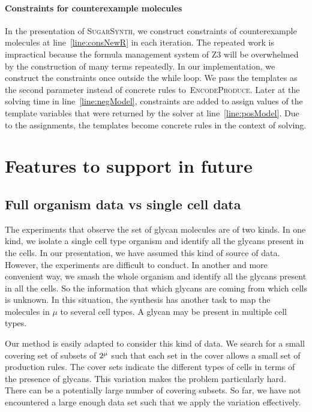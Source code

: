 \documentclass{llncs}
\begin{document}
\paragraph{Constraints for counterexample molecules}
In the presentation of \textsc{SugarSynth}, we construct constraints of counterexample molecules
at line~\ref{line:consNewR} in each iteration.
The repeated work is impractical because the formula management system of Z3 will be overwhelmed by
the construction of many terms repeatedly. In our implementation, we construct the constraints
once outside the while loop.
We pass the templates as the second parameter instead of concrete rules to~\textsc{EncodeProduce}.
Later at the solving time in line~\ref{line:negModel}, constraints are added to assign values
of the template variables that were returned by the solver at line~\ref{line:posModel}.
Due to the assignments, the templates become concrete rules in the context of solving.

\section{Features to support in future}

\subsection{Full organism data vs single cell data}

The experiments that observe the set of glycan molecules are of two kinds. In one kind, we isolate a single cell type organism and identify all the glycans present in the cells. In our presentation, we have assumed this kind of source of data. However, the experiments are difficult to conduct.
In another and more convenient way, we smash the whole organism and identify all the glycans present in all the cells.
So the information that which glycans are coming from which
cells is unknown.
In this situation, the synthesis has another task to map the molecules
in $\mu$ to several cell types.
A glycan may be present in multiple cell types.

Our method is easily adapted to consider this kind of data.
We search for a small covering set of subsets of
$2^{\mu}$ such that each set in the cover allows a small
set of production rules.
The cover sets indicate the different types of cells in terms of
the presence of glycans.
This variation makes the problem particularly hard.
There can be a potentially large number of covering subsets.
So far, we have not encountered a large enough data set such that
we apply the variation effectively. 
\end{document}
